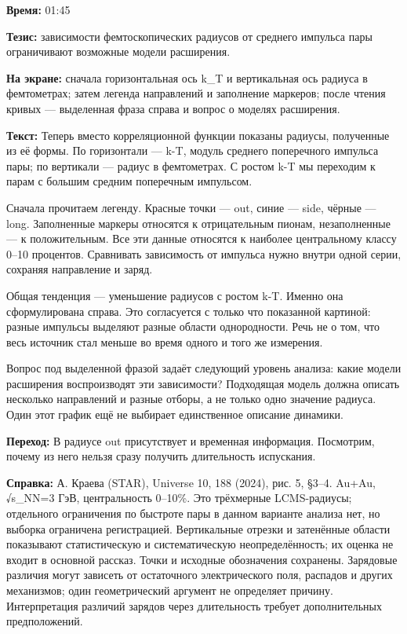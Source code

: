 \textbf{Время:} 01:45

\textbf{Тезис:} зависимости фемтоскопических радиусов от среднего импульса пары ограничивают возможные модели расширения.

\textbf{На экране:} сначала горизонтальная ось k\_T и вертикальная ось радиуса в фемтометрах; затем легенда направлений и заполнение маркеров; после чтения кривых — выделенная фраза справа и вопрос о моделях расширения.

\textbf{Текст:} Теперь вместо корреляционной функции показаны радиусы, полученные из её формы. По горизонтали — k-T, модуль среднего поперечного импульса пары; по вертикали — радиус в фемтометрах. С ростом k-T мы переходим к парам с большим средним поперечным импульсом.

Сначала прочитаем легенду. Красные точки — out, синие — side, чёрные — long. Заполненные маркеры относятся к отрицательным пионам, незаполненные — к положительным. Все эти данные относятся к наиболее центральному классу 0–10 процентов. Сравнивать зависимость от импульса нужно внутри одной серии, сохраняя направление и заряд.

Общая тенденция — уменьшение радиусов с ростом k-T. Именно она сформулирована справа. Это согласуется с только что показанной картиной: разные импульсы выделяют разные области однородности. Речь не о том, что весь источник стал меньше во время одного и того же измерения.

Вопрос под выделенной фразой задаёт следующий уровень анализа: какие модели расширения воспроизводят эти зависимости? Подходящая модель должна описать несколько направлений и разные отборы, а не только одно значение радиуса. Один этот график ещё не выбирает единственное описание динамики.

\textbf{Переход:} В радиусе out присутствует и временная информация. Посмотрим, почему из него нельзя сразу получить длительность испускания.

\textbf{Справка:} А. Краева (STAR), Universe 10, 188 (2024), рис. 5, §3–4. Au+Au, √s\_NN=3 ГэВ, центральность 0–10\%. Это трёхмерные LCMS-радиусы; отдельного ограничения по быстроте пары в данном варианте анализа нет, но выборка ограничена регистрацией. Вертикальные отрезки и затенённые области показывают статистическую и систематическую неопределённость; их оценка не входит в основной рассказ. Точки и исходные обозначения сохранены. Зарядовые различия могут зависеть от остаточного электрического поля, распадов и других механизмов; один геометрический аргумент не определяет причину. Интерпретация различий зарядов через длительность требует дополнительных предположений.

